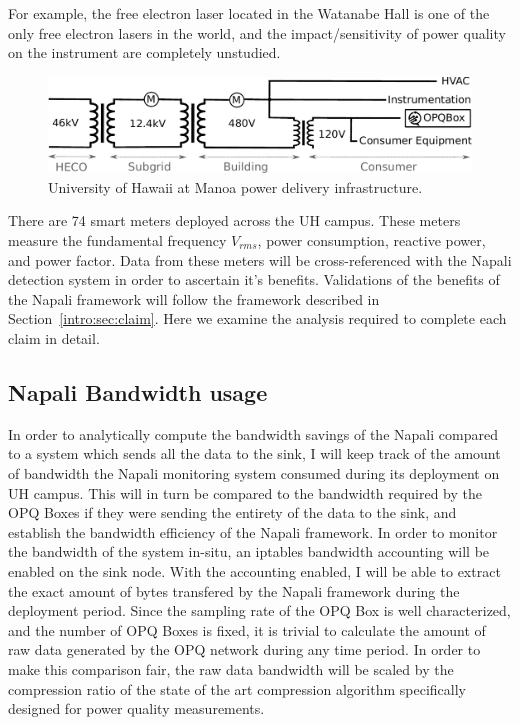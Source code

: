 For example, the free electron laser located in the Watanabe Hall is one of the only free electron lasers in the world, and the impact/sensitivity of power quality on the instrument are completely unstudied.
\begin{figure}[h]
	\centering
	\includegraphics[width=1\linewidth]{img/uh-grid.pdf}	
	\caption{University of Hawaii at Manoa power delivery infrastructure.}
	\label{expdes:fig:1}
\end{figure}

There are 74 smart meters deployed across the UH campus.
These meters measure the fundamental frequency $V_{rms}$, power consumption, reactive power, and power factor.
Data from these meters will be cross-referenced with the Napali detection system in order to ascertain it's benefits.
Validations of the benefits of the Napali framework will follow the framework described in Section~\ref{intro:sec:claim}.
Here we examine the analysis required to complete each claim in detail.

\subsection{Napali Bandwidth usage} \label{iexp:sec:band}
In order to analytically compute the bandwidth savings of the Napali compared to a system which sends all the data to the sink, I will keep track of the amount of bandwidth the Napali monitoring system consumed during its deployment on UH campus.
This will in turn be compared to the bandwidth required by the OPQ Boxes if they were sending the entirety of the data to the sink, and establish the bandwidth efficiency of the Napali framework.
In order to monitor the bandwidth of the system in-situ, an iptables bandwidth accounting will be enabled on the sink node.
With the accounting enabled, I will be able to extract the exact amount of bytes transfered by the Napali framework during the deployment period.
Since the sampling rate of the OPQ Box is well characterized, and the number of OPQ Boxes is fixed, it is trivial to calculate the amount of raw data generated by the OPQ network during any time period.
In order to make this comparison fair, the raw data bandwidth will be scaled by the compression ratio of the state of the art compression algorithm specifically designed for power quality measurements.\cite{zhang2009new}

